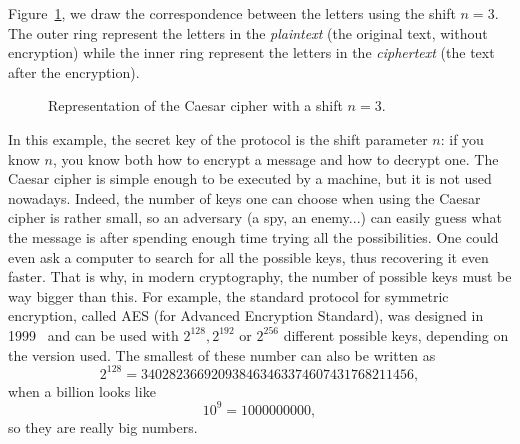 Figure~\ref{fig:caesar}, we draw the correspondence between the letters using
the shift $n=3$. The outer ring represent the letters in the \emph{plaintext}
(the original text, without encryption) while the inner ring represent the
letters in the \emph{ciphertext} (the text after the encryption).
\begin{figure}[h]
  \centering
  \caption{Representation of the Caesar cipher with a shift $n=3$.}
  \label{fig:caesar}
\end{figure}
In this example, the secret key of the protocol is the shift parameter $n$: if
you know $n$, you know both how to encrypt a message and how to decrypt one.
The Caesar cipher is simple enough to be executed by a machine, but it is not
used nowadays. Indeed, the number of keys one can choose when using the Caesar
cipher is rather small, so an adversary (a spy, an enemy...) can easily guess
what the message is after spending enough time trying all the possibilities. One could
even ask a computer to search for all the possible keys, thus recovering it even
faster. That is why, in modern cryptography, the number of possible keys must be
way bigger than this. For example, the standard protocol for symmetric
encryption, called AES (for Advanced Encryption Standard), was designed in
1999~\cite{DR99, DR02} and can be used with $2^{128}, 2^{192}$ or $2^{256}$
different possible keys, depending on the version used. The smallest of these
number can also be written as
\[
  2^{128} = 340282366920938463463374607431768211456,
\]
when a billion looks like
\[
  10^{9} = 1000000000,
\]
so they are really big numbers.

